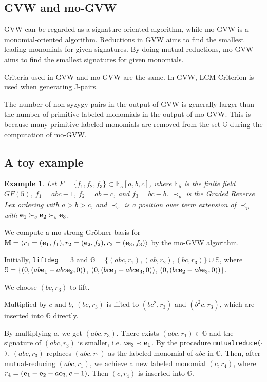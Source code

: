 \documentclass[final, number, 3p,12pt]{elsarticle}
\newtheorem{example}[theorem]{Example}
\def\G{{\mathbb{G}}}
\def\S{{\mathbb{S}}}
\def\M{{\mathbb M}}
\def\e{{\bf e}}
\begin{document}
\subsection{GVW and mo-GVW} \label{subsec_relation}

GVW can be regarded as a signature-oriented algorithm, while mo-GVW is a monomial-oriented algorithm. Reductions in GVW aims to find the smallest leading monomials for given signatures. By doing mutual-reductions, mo-GVW aims to find the smallest signatures for given monomials.

Criteria used in GVW and mo-GVW are the same. In GVW, LCM Criterion is used when generating J-pairs.

The number of non-syzygy pairs in the output of GVW is generally larger than the number of primitive labeled monomials in the output of mo-GVW. This is because many primitive labeled monomials are removed from the set $\G$ during the computation of mo-GVW.










\subsection{A toy example} \label{subsec_example}

\begin{example}
Let $F=\{f_1, f_2, f_3\} \subset \mathbb{F}_5[a, b, c]$, where $\mathbb{F}_5$ is the finite field $GF(5)$, $f_1 = abc-1$, $f_2=ab-c$, and $f_3=bc-b$. $\prec_p$ is the Graded Reverse Lex ordering with $a > b > c$, and $\prec_s$ is a position over term extension of $\prec_p$ with $\e_1 \succ_s \e_2 \succ_s \e_3$.
\end{example}

We compute a mo-strong Gr\"obner basis for $\M=\langle r_1 = (\e_1, f_1), r_2 = (\e_2, f_2), r_3 = (\e_3, f_3) \rangle$ by the mo-GVW algorithm.

Initially, {\tt liftdeg} $ = 3$ and $\G = \{(abc, r_1), (ab, r_2), (bc, r_3)\} \cup \S$, where $\S = \{(0, (ab \e_1 - abc \e_2, 0))$, $(0, (bc\e_1 - abc\e_3, 0))$, $(0, (bc\e_2 - ab\e_3, 0))\}$. 

 We choose $(bc, r_3)$ to lift. 

Multiplied by $c$ and $b$, $(bc, r_3)$ is lifted to $(bc^2, r_3)$ and $(b^2c, r_3)$, which are inserted into $\G$ directly. 

By multiplying $a$, we get $(abc, r_3)$. There exists $(abc, r_1) \in \G$ and the signature of $(abc, r_3)$ is smaller, i.e. $a\e_3 \prec \e_1$. By the procedure {\tt mutualreduce($\cdot$)}, $(abc, r_3)$ replaces $(abc, r_1)$ as the labeled monomial of $abc$ in $\G$. Then, after mutual-reducing $(abc, r_1)$, we achieve a new labeled monomial $(c, r_4)$, where $r_4 = (\e_1-\e_2-a\e_3, c-1)$. Then $(c, r_4)$ is inserted into $\G$.
\end{document}
